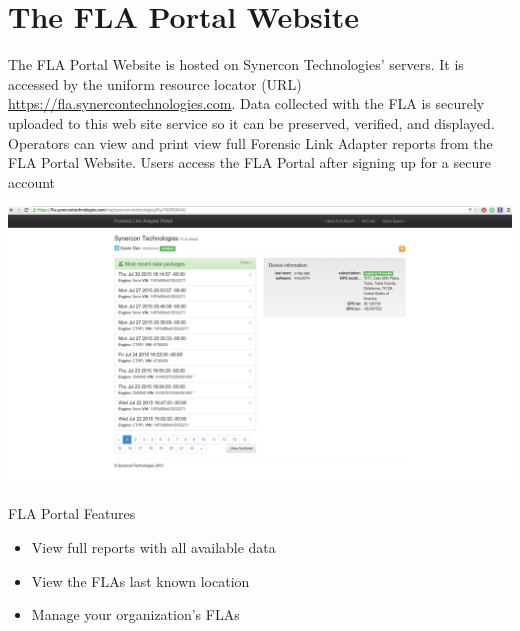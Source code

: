 \documentclass[11pt, oneside]{book}
\begin{document}
\section{The FLA Portal Website}
\vspace{1cm}
The FLA Portal Website is hosted on Synercon Technologies' servers. It is accessed by the uniform resource locator (URL)  \url{https://fla.synercontechnologies.com}.
Data collected with the FLA is securely uploaded to this web site service so it can be preserved, verified, and displayed. Operators can view and print
view full Forensic  Link Adapter reports from the FLA Portal Website. Users access the FLA Portal after signing up for a secure account 
\vspace{1cm}
\begin{center}
\includegraphics[width=.9\linewidth]{../media/fla_portal_screenshots/user_landing_page}
\end{center}
\vspace{1cm}
FLA Portal Features
\begin{itemize}
\item View full reports with all available data
\item View the FLAs last known location
\item Manage your organization's FLAs
\end{itemize}
\newpage
\end{document}
